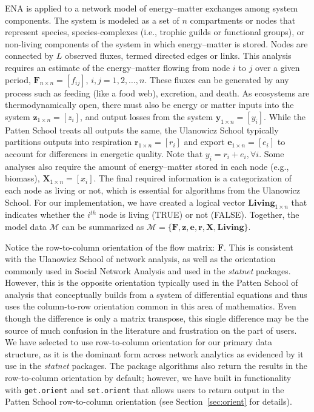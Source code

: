 \documentclass[article]{jss}
\begin{document}
ENA is applied to a network model of energy--matter exchanges among
system components.  The system is modeled as a set of $n$ compartments
or nodes that represent species, species-complexes (i.e., trophic
guilds or functional groups), or non-living components of the system
in which energy--matter is stored.  Nodes are connected by $L$
observed fluxes, termed directed edges or links.  This analysis
requires an estimate of the energy--matter flowing from node $i$ to
$j$ over a given period, $\mathbf{F}_{n\times n}=[f_{ij}]$,
$i,j=1,2,\ldots,n$.  These fluxes can be generated by any process such
as feeding (like a food web), excretion, and death.  As ecosystems are
thermodynamically open, there must also be energy or matter inputs into
the system $\mathbf{z}_{1 \times n}=[z_i]$, and output losses from the
system $\mathbf{y}_{1 \times n}=[y_i]$.  While the Patten School treats
all outputs the same, the Ulanowicz School typically partitions
outputs into respiration $\mathbf{r}_{1\times n}=[r_i]$ and export
$\mathbf{e}_{1\times n}=[e_i]$ to account for differences in energetic
quality. Note that $y_i = r_i + e_i, \forall i$.  Some analyses
also require the amount of energy--matter stored in each node (e.g.,
biomass), $\mathbf{X}_{1\times n}=[x_i]$.  The final required
information is a categorization of each node as living or not, which
is essential for algorithms from the Ulanowicz School.  For
our implementation, we have created a logical vector $\mathbf{Living}_{1 \times
  n}$ that indicates whether the $i^{th}$ node is living (TRUE)
or not (FALSE).  Together, the model data $\mathcal{M}$ can be
summarized as $\mathcal{M} =
\{\mathbf{F}, \mathbf{z}, \mathbf{e}, \mathbf{r}, \mathbf{X}, \mathbf{Living}\}$.


Notice the row-to-column orientation of the flow matrix:
$\mathbf{F}$. This is consistent with the Ulanowicz School of network
analysis, as well as the orientation commonly used in Social Network
Analysis and used in the \textit{statnet} packages.  However, this is
the opposite orientation typically used in the Patten School of
analysis that conceptually builds from a system of differential
equations and thus uses the column-to-row orientation common in this
area of mathematics. Even though the difference is only a matrix
transpose, this single difference may be the source of much confusion
in the literature and frustration on the part of users.  We have
selected to use row-to-column orientation for our primary data
structure, as it is the dominant form across network analytics as
evidenced by it use in the \textit{statnet} packages. The package
algorithms also return the results in the row-to-column orientation by
default; however, we have built in functionality with
\texttt{get.orient} and \texttt{set.orient} that allows users to
return output in the Patten School row-to-column orientation (see
Section~\ref{sec:orient} for details).
\end{document}
